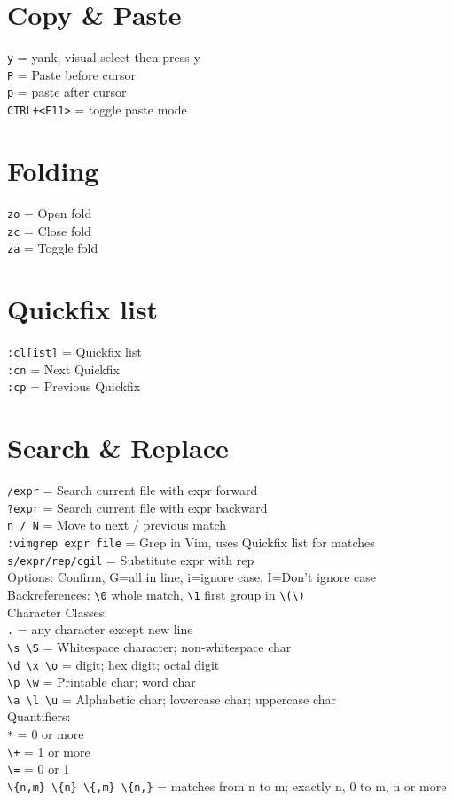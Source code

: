 \documentclass[10pt,DIV=50,landscape,pagesize,parskip=off]{scrartcl}
\newcommand\co[1]{\texttt{#1}}
\newcommand\coe[2]{\co{#1} = #2}
\begin{document}
\begin{multicols}{3}
\section{Copy \& Paste}
\coe{y}{yank, visual select then press y}\\
\coe{P}{Paste before cursor}\\
\coe{p}{paste after cursor}\\
\coe{CTRL+<F11>}{toggle paste mode}

\section{Folding}
\coe{zo}{Open fold}\\
\coe{zc}{Close fold}\\
\coe{za}{Toggle fold}

\section{Quickfix list}
\coe{:cl[ist]}{Quickfix list}\\
\coe{:cn}{Next Quickfix}\\
\coe{:cp}{Previous Quickfix}

\section{Search \& Replace}
\coe{/expr}{Search current file with expr forward}\\
\coe{?expr}{Search current file with expr backward}\\
\coe{n / N}{Move to next / previous match}\\
\coe{:vimgrep expr file}{Grep in Vim, uses Quickfix list for matches}\\
\coe{s/expr/rep/cgil}{Substitute expr with rep\\Options: Confirm, G=all in line, i=ignore case, I=Don't ignore case}\\
Backreferences: \lstinline|\0| whole match, \lstinline|\1| first group in \lstinline|\(\)|\\
Character Classes:\\
\coe{.}{any character except new line}\\
\lstinline|\s \S| = Whitespace character; non-whitespace char\\
\lstinline|\d \x \o| = digit; hex digit; octal digit\\
\lstinline|\p \w| = Printable char; word char\\
\lstinline|\a \l \u| = Alphabetic char; lowercase char; uppercase char\\
Quantifiers:\\
\lstinline|*| = 0 or more\\
\lstinline|\+| = 1 or more\\
\lstinline|\=| = 0 or 1\\
\lstinline|\{n,m} \{n} \{,m} \{n,}| = matches from n to m; exactly n, 0 to m, n or more


\end{multicols}
\end{document}
